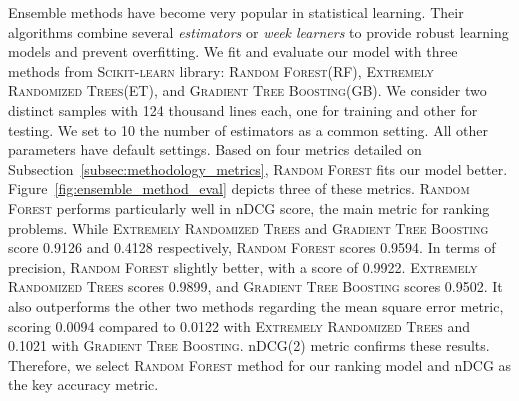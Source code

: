 Ensemble methods have become very popular in statistical learning. Their algorithms combine several \emph{estimators} or \emph{week learners} to provide robust learning models and prevent overfitting. We fit and evaluate our model with three methods from \textsc{Scikit-learn} library: \textsc{Random Forest}(RF), \textsc{Extremely Randomized Trees}(ET), and \textsc{Gradient Tree Boosting}(GB). We consider two distinct samples with 124 thousand lines each, one for training and other for testing. We set to 10 the number of estimators as a common setting. All other parameters have default settings. Based on four metrics detailed on Subsection~\ref{subsec:methodology_metrics}, \textsc{Random Forest} fits our model better. Figure~\ref{fig:ensemble_method_eval} depicts three of these metrics. \textsc{Random Forest} performs particularly well in nDCG score, the main metric for ranking problems. While \textsc{Extremely Randomized Trees} and \textsc{Gradient Tree Boosting} score 0.9126 and 0.4128 respectively, \textsc{Random Forest} scores 0.9594. In terms of precision, \textsc{Random Forest} slightly better, with a score of 0.9922.  \textsc{Extremely Randomized Trees} scores 0.9899, and \textsc{Gradient Tree Boosting} scores 0.9502.  It also outperforms the other two methods regarding the mean square error metric, scoring 0.0094 compared to 0.0122 with \textsc{Extremely Randomized Trees} and 0.1021 with \textsc{Gradient Tree Boosting}. nDCG(2) metric confirms these results. Therefore, we select \textsc{Random Forest} method for our ranking model and nDCG as the key accuracy metric. 

